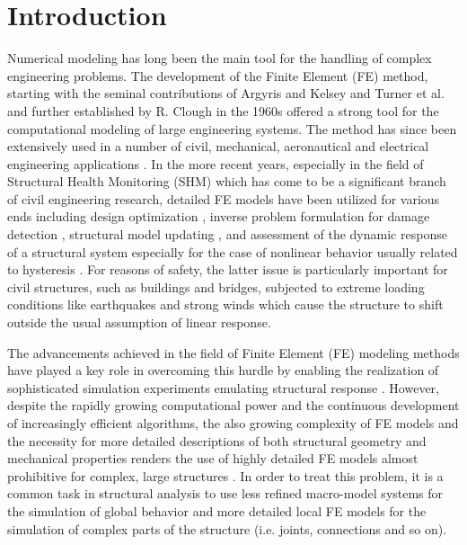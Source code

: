 \documentclass[preprint,3p,review,times,11pt]{elsarticle}
\begin{document}
\section{Introduction}
Numerical modeling has long been the main tool for the handling of complex engineering problems. The development of the Finite Element (FE) method, starting with the seminal contributions of Argyris and Kelsey \cite{Argyris-Kelsey1955} and Turner et al. \cite{Turner-etal1956} and further established by R. Clough \cite{Clough1960} in the 1960s offered a strong tool for the computational modeling of large engineering systems. The method has since been extensively used in a number of civil, mechanical, aeronautical and electrical engineering applications \cite{Bathe2009}. In the more recent years, especially in the field of Structural Health Monitoring (SHM) which has come to be a significant branch of civil engineering research, detailed FE models have been utilized for various ends including design optimization \cite{Chang-Perl1988}, inverse problem formulation for damage detection \cite{Waisman-etal2010, Rabinovich-etal2007}, structural model updating \cite{Papadimitriou-etal2012, Mottershead-Friswell1993}, and assessment of the dynamic response of a structural system especially for the case of nonlinear behavior usually related to hysteresis \cite{Taucer-etal1991, Triantafyllou-Koumousis2012}. For reasons of safety, the latter issue is particularly important for civil structures, such as buildings and bridges, subjected to extreme loading conditions like earthquakes and strong winds which cause the structure to shift  outside the usual assumption of linear response.


The advancements achieved in the field of Finite Element (FE) modeling methods have played a key role in overcoming this hurdle by enabling the realization of sophisticated simulation experiments emulating structural response \cite{Bathe2009}. However, despite the rapidly growing computational power and the continuous development of increasingly efficient algorithms, the also growing complexity of FE models and the necessity for more detailed descriptions of both structural geometry and mechanical properties renders the use of highly detailed FE models almost prohibitive for complex, large structures \cite{Gholizadeh-Salajegheh2009}. In order to treat this problem, it is a common task in structural analysis to use less refined macro-model systems for the simulation of global behavior and more detailed local FE models for the simulation of complex parts of the structure (i.e. joints, connections and so on). 
\end{document}
